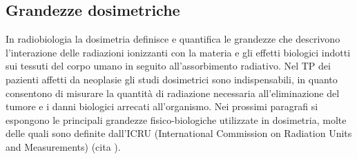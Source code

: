 \documentclass[12pt,a4paper,twoside]{report}
\begin{document}
	\subsection{Grandezze dosimetriche}
	In radiobiologia la dosimetria definisce e quantifica le grandezze che descrivono l'interazione delle radiazioni ionizzanti con la materia e gli effetti biologici indotti sui tessuti del corpo umano in seguito all'assorbimento radiativo. Nel TP dei pazienti affetti da neoplasie gli studi dosimetrici sono indispensabili, in quanto consentono di misurare la quantità di radiazione necessaria all'eliminazione del tumore e i danni biologici arrecati all'organismo. Nei prossimi paragrafi si espongono le principali grandezze fisico-biologiche utilizzate in dosimetria, molte delle quali sono definite dall'ICRU (International Commission on Radiation Units and Measurements) (cita
	).
	
\end{document}

